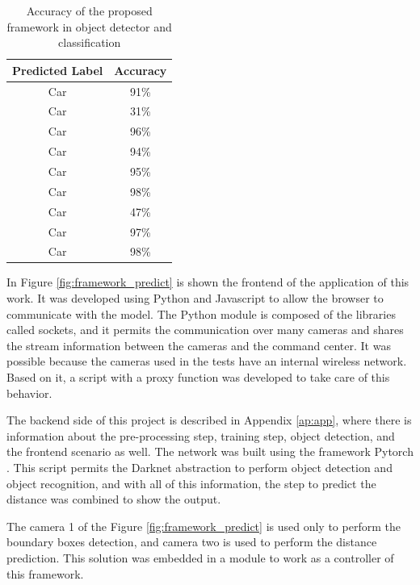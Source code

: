 \begin{table}[H]
\centering
\caption{Accuracy of the proposed framework in object detector and classification}
\begin{tabular}{c|c}
\hline
Predicted Label & Accuracy \\ \hline
Car             & 91\%     \\ \hline
Car             & 31\%     \\ \hline
Car             & 96\%     \\ \hline
Car             & 94\%     \\ \hline
Car             & 95\%     \\ \hline
Car             & 98\%     \\ \hline
Car             & 47\%     \\ \hline
Car             & 97\%     \\ \hline
Car             & 98\%     \\ \hline
\end{tabular}
\label{tab:accuracy}
\end{table}



In Figure \ref{fig:framework_predict} is shown the frontend of the application of this work. It was developed using Python and Javascript to allow the browser to communicate with the model. The Python module is composed of the libraries called sockets, and it permits the communication over many cameras and shares the stream information between the cameras and the command center. It was possible because the cameras used in the tests have an internal wireless network. Based on it, a script with a proxy function was developed to take care of this behavior. 

The backend side of this project is described in Appendix \ref{ap:app}, where there is information about the pre-processing step, training step, object detection, and the frontend scenario as well. The network was built using the framework Pytorch \cite{paszke2019pytorch}. This script permits the Darknet abstraction to perform object detection and object recognition, and with all of this information, the step to predict the distance was combined to show the output. 

The camera 1 of the Figure \ref{fig:framework_predict} is used only to perform the boundary boxes detection, and camera two is used to perform the distance prediction. This solution was embedded in a module to work as a controller of this framework.

